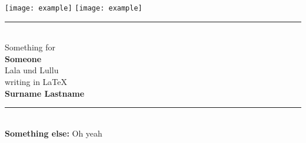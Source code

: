 \newcommand{\HRule}[2]{\noindent\rule[#1]{\linewidth}{#2}}
\newcommand{\vlinespace}[1]{\vspace*{#1\baselineskip}}
\newcommand{\titleemph}[1]{\textbf{#1}}
\begin{titlepage}
    \sffamily
    \texttt{[image: example]}
    \hfill
    \texttt{[image: example]}
    \HRule{13pt}{1pt}
    \centering
    \Large
    \vlinespace{5}\\
    Something for\\
    \huge
    \textbf{Someone}\\
    \Large
    \vlinespace{3}
    Lala und Lullu\\
    writing in \LaTeX\\
    \vlinespace{6}
    \huge
    \textbf{Surname Lastname}\\
    \Large
    \vfill
    \raggedright{}
    \HRule{13pt}{1pt} \\
    \titleemph{Something else:} Oh yeah
\end{titlepage}